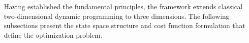 Having established the fundamental principles, the framework extends classical two-dimensional dynamic programming to three dimensions. The following subsections present the state space structure and cost function formulation that define the optimization problem.
